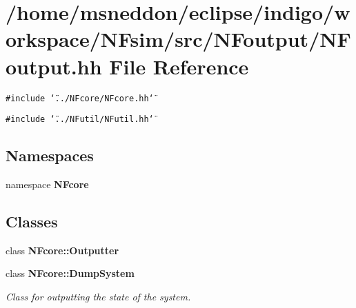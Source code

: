 \section{/home/msneddon/eclipse/indigo/workspace/NFsim/src/NFoutput/NFoutput.hh File Reference}
\label{NFoutput_8hh}


{\tt \#include \char`\"{}../NFcore/NFcore.hh\char`\"{}}\par
{\tt \#include \char`\"{}../NFutil/NFutil.hh\char`\"{}}\par
\subsection*{Namespaces}
\begin{CompactItemize}
\item 
namespace {\bf NFcore}
\end{CompactItemize}
\subsection*{Classes}
\begin{CompactItemize}
\item 
class {\bf NFcore::Outputter}
\item 
class {\bf NFcore::DumpSystem}
\begin{CompactList}\small\item\em Class for outputting the state of the system. \item\end{CompactList}\end{CompactItemize}
